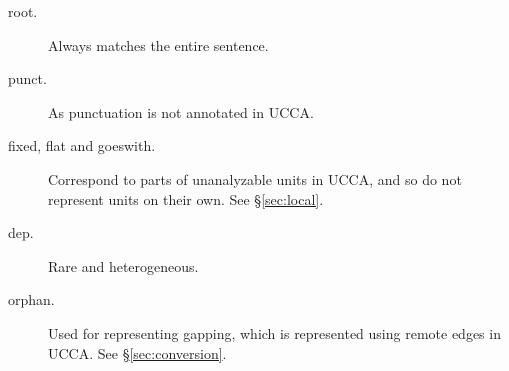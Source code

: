 \documentclass[11pt,a4paper]{article}
\begin{document}
\begin{description}
  \item[root.] Always matches the entire sentence.
  \item[punct.] As punctuation is not annotated in UCCA.
  \item[fixed, flat and goeswith.] Correspond to parts of unanalyzable units in UCCA,
    and so do not represent units on their own. See \S\ref{sec:local}.
  \item[dep.] Rare and heterogeneous.
  \item[orphan.] Used for representing gapping, which is represented using remote edges in UCCA. See \S\ref{sec:conversion}.
\end{description}



%
%
%
\end{document}
